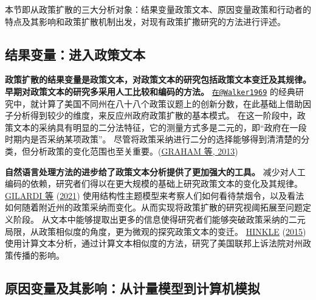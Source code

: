 \documentclass[
  12pt,
]{ctexart}
\begin{document}
本节即从政策扩散的三大分析对象：结果变量政策文本、原因变量政策和行动者的特点及其影响和政策扩散机制出发，对现有政策扩撒研究的方法进行评述。

\hypertarget{ux7ed3ux679cux53d8ux91cfux8fdbux5165ux653fux7b56ux6587ux672c}{%
\subsection{结果变量：进入政策文本}\label{ux7ed3ux679cux53d8ux91cfux8fdbux5165ux653fux7b56ux6587ux672c}}

\textbf{政策扩散的结果变量是政策文本，对政策文本的研究包括政策文本变迁及其规律。}
\textbf{早期对政策文本的研究多采用人工比较和编码的方法。}
\href{mailto:在@Walker1969}{\nolinkurl{在@Walker1969}} 的经典研究中，就计算了美国不同州在八十八个政策议题上的创新分数，在此基础上借助因子分析得到较少的维度，来反应州政府政策扩散的基本模式。
在这一阶段中，政策文本的采纳具有明显的二分法特征，它的测量方式多是二元的，即``政府在一段时期内是否采纳某项政策''。
尽管将政策采纳进行二分的选择能够得到清清楚的分类，但分析政策的变化范围也至关重要。(\protect\hyperlink{ref-GrahamEtAl2013}{GRAHAM 等, 2013})

\textbf{自然语言处理方法的进步给了政策文本分析提供了更加强大的工具。}
减少对人工编码的依赖，研究者们得以在更大规模的基础上研究政策文本的变化及其规律。
\protect\hyperlink{ref-GilardiEtAl2021}{GILARDI 等} (\protect\hyperlink{ref-GilardiEtAl2021}{2021}) 使用结构性主题模型来考察人们如何看待禁烟令，以及看法如何随着附近州的政策采纳而变化。从而实现将政策扩散的研究视阈拓展至问题定义阶段。
从文本中能够提取出更多的信息使得研究者们能够突破政策采纳的二元局限，从政策相似度的角度，更为微观的探究政策文本的变迁。
\protect\hyperlink{ref-Hinkle2015}{HINKLE} (\protect\hyperlink{ref-Hinkle2015}{2015}) 使用计算文本分析，通过计算文本相似度的方法，研究了美国联邦上诉法院对州政策传播的影响。

\hypertarget{ux539fux56e0ux53d8ux91cfux53caux5176ux5f71ux54cdux4eceux8ba1ux91cfux6a21ux578bux5230ux8ba1ux7b97ux673aux6a21ux62df}{%
\subsection{原因变量及其影响：从计量模型到计算机模拟}\label{ux539fux56e0ux53d8ux91cfux53caux5176ux5f71ux54cdux4eceux8ba1ux91cfux6a21ux578bux5230ux8ba1ux7b97ux673aux6a21ux62df}}
\end{document}

